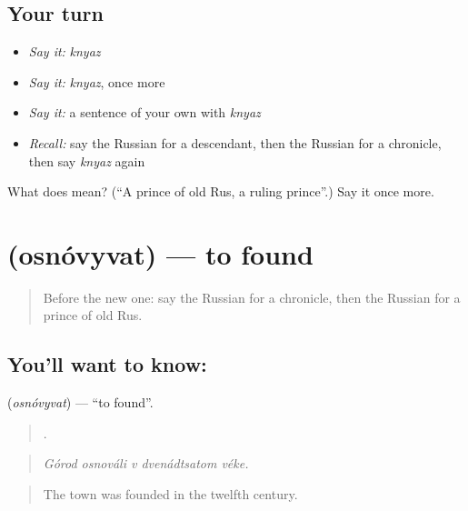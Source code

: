 \subsection*{Your turn}
\begin{itemize}
\raggedright
  \item \emph{Say it:} \emph{knyaz}
  \item \emph{Say it:} \emph{knyaz}, once more
  \item \emph{Say it:} a sentence of your own with \emph{knyaz}
  \item \emph{Recall:} say the Russian for a descendant, then the Russian for a chronicle, then say \emph{knyaz} again
\end{itemize}

\begin{tcolorbox}[breakable,colback=teal!4,colframe=teal!35!black,title={Before you move on}]
What does  mean? (\textquotedblleft{}A prince of old Rus, a ruling prince\textquotedblright{}.) Say it once more.
\end{tcolorbox}
\section[\texorpdfstring{\ru{основывать} (osnóvyvat)}{основывать (osnóvyvat)}]{ (osnóvyvat) — to found}

\label{lesson:RU-C326-osnovyvat}



\begin{quote}
Before the new one: say the Russian for a chronicle, then the Russian for a prince of old Rus.
\end{quote}

\subsection*{You'll want to know: }
\textbf{} (\emph{osnóvyvat}) — \textquotedblleft{}to found\textquotedblright{}.

\begin{quote}
    .
\end{quote}

\begin{quote}
\emph{Górod osnováli v dvenádtsatom véke.}
\end{quote}

\begin{quote}
The town was founded in the twelfth century.
\end{quote}

